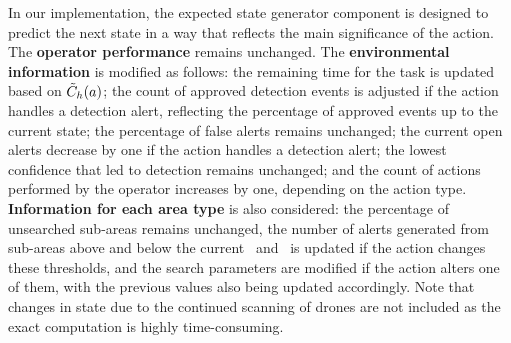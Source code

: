 In our implementation, the expected state generator component is designed to predict the next state in a way that reflects the main significance of the action. The \textbf{operator performance} remains unchanged. The \textbf{environmental information} is modified as follows: the remaining time for the task is updated based on $\Tilde{C}_h(a)$; the count of approved detection events is adjusted if the action handles a detection alert, reflecting the percentage of approved events up to the current state; the percentage of false alerts remains unchanged; the current open alerts decrease by one if the action handles a detection alert; the lowest confidence that led to detection remains unchanged; and the count of actions performed by the operator increases by one, depending on the action type.
\textbf{Information for each area type} is also considered: the percentage of unsearched sub-areas remains unchanged, the number of alerts generated from sub-areas above and below the current \detectiothreshold\ and \pausetreshold\ is updated if the action changes these thresholds, and the search parameters are modified if the action alters one of them, with the previous values also being updated accordingly.
Note that changes in state due to the continued scanning of drones are not included as the exact computation is highly time-consuming. 







